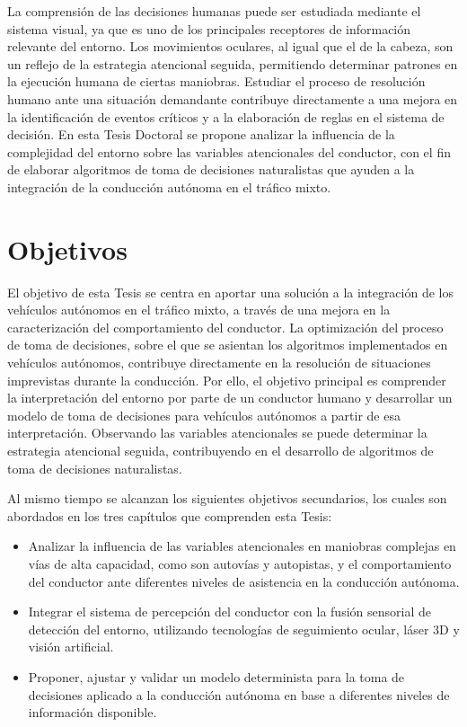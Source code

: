 La comprensión de las decisiones humanas puede ser estudiada mediante el sistema visual, ya que es uno de los principales receptores de información relevante del entorno. Los movimientos oculares, al igual que el de la cabeza, son un reflejo de la estrategia atencional seguida, permitiendo determinar patrones en la ejecución humana de ciertas maniobras. Estudiar el proceso de resolución humano ante una situación demandante contribuye directamente a una mejora en la identificación de eventos críticos y a la elaboración de reglas en el sistema de decisión. En esta Tesis Doctoral se propone analizar la influencia de la complejidad del entorno sobre las variables atencionales del conductor, con el fin de elaborar algoritmos de toma de decisiones naturalistas que ayuden a la integración de la conducción autónoma en el tráfico mixto. 

\section{Objetivos}

El objetivo de esta Tesis se centra en aportar una solución a la integración de los vehículos autónomos en el tráfico mixto, a través de una mejora en la caracterización del comportamiento del conductor. La optimización del proceso de toma de decisiones, sobre el que se asientan los algoritmos implementados en vehículos autónomos, contribuye directamente en la resolución de situaciones imprevistas durante la conducción. Por ello, el objetivo principal es comprender la interpretación del entorno por parte de un conductor humano y desarrollar un modelo de toma de decisiones para vehículos autónomos a partir de esa interpretación. Observando las variables atencionales se puede determinar la estrategia atencional seguida, contribuyendo en el desarrollo de algoritmos de toma de decisiones naturalistas.

Al mismo tiempo se alcanzan los siguientes objetivos secundarios, los cuales son abordados en los tres capítulos que comprenden esta Tesis:

\begin{itemize}
  \item Analizar la influencia de las variables atencionales en maniobras complejas en vías de alta capacidad, como son autovías y autopistas, y el comportamiento del conductor ante diferentes niveles de asistencia en la conducción autónoma.
  \item Integrar el sistema de percepción del conductor con la fusión sensorial de detección del entorno, utilizando tecnologías de seguimiento ocular, láser 3D y visión artificial.
  \item Proponer, ajustar y validar un modelo determinista para la toma de decisiones aplicado a la conducción autónoma en base a diferentes niveles de información disponible. 
\end{itemize}

